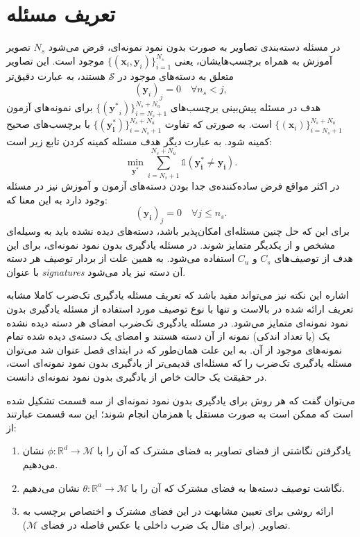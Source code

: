 \section{تعریف مسئله}\label{problem_definition}
در مسئله دسته‌بندی تصاویر به صورت بدون نمود نمونه‌ای، فرض می‌شود $N_s$ تصویر آموزش به همراه برچسب‌هایشان، یعنی 
    $ \{ (\mathbf{x}_i, \mathbf{y}_i) \}_{i=1}^{N_s} $
    موجود است. این تصاویر متعلق به دسته‌های موجود در $\mathcal{S}$ هستند، به عبارت دقیق‌تر 
    \begin{equation}    
     (\mathbf{y}_i)_j = 0
     \quad \forall n_s < j,
    \end{equation}
    هدف در مسئله پیش‌بینی برچسب‌های 
$ \{ (\mathbf{y^{\ast}}_i) \}_{i=N_s + 1}^{N_s + N_u} $
برای 
     نمونه‌های آزمون 
$ \{ (\mathbf{x}_i) \}_{i=N_s + 1}^{N_s + N_u} $
است. به صورتی که تفاوت
 $ \{ (\mathbf{y^{\ast}_i}) \}_{i=N_s + 1}^{N_s + N_u} $ 
 با برچسب‌های صحیح 
‌کمینه شود. به عبارت دیگر هدف مسئله کمینه کردن تابع زیر است:
\begin{equation}
\min_{\mathbf{y^{\ast}}} \sum_{i=N_s+1}^{N_s + N_u} \mathds{1}(\mathbf{y^{\ast}_i \neq y_i}). 
\end{equation}
در اکثر مواقع فرض ساده‌کننده‌ی جدا بودن دسته‌های آزمون و آموزش نیز در مسئله وجود دارد به این معنا که:
\begin{equation}
\mathbf{(y_i)}_j = 0    \quad \forall  j \leq n_s.
\end{equation}
برای این که حل چنین مسئله‌ای امکان‌پذیر باشد، دسته‌های دیده نشده باید به وسیله‌ای مشخص و از یکدیگر متمایز شوند. در مسئله یادگیری بدون نمود نمونه‌ای، برای این هدف از توصیف‌های $C_s$ و $C_u$ استفاده می‌شود. به همین علت از بردار توصیف هر دسته با عنوان \textit{\glspl{signature}} آن دسته نیز یاد می‌شود. 

اشاره این نکته نیز می‌تواند مفید باشد که تعریف مسئله یادگیری تک‌ضرب کاملا مشابه تعریف ارائه شده در بالاست و تنها با نوع توصیف مورد استفاده از مسئله یادگیری بدون نمود نمونه‌ای متمایز می‌شود. در مسئله یادگیری تک‌ضرب امضای هر دسته دیده نشده یک (یا تعداد اندکی) نمونه از آن دسته هستند و امضای یک دسته‌ی دیده شده تمام نمونه‌های موجود از آن. به این علت همان‌طور که در ابتدای فصل عنوان شد می‌توان مسئله یادگیری تک‌ضرب را که مسئله‌ای قدیمی‌تر از یادگیری بدون نمود نمونه‌ای است، در حقیقت یک حالت خاص از یادگیری بدون نمود نمونه‌ای دانست.
  

 می‌توان گفت که هر روش برای یادگیری بدون نمود نمونه‌ای از سه قسمت تشکیل شده است که ممکن است به صورت مستقل یا همزمان انجام شوند؛ این سه قسمت عبارتند از:
\begin{enumerate}
  \item یادگرفتن نگاشتی از فضای تصاویر به فضای مشترک
  که آن را با 
  $\phi: \mathbb{R}^d \to \mathcal{M}$
   نشان می‌دهیم.
  \item نگاشت توصیف دسته‌ها به فضای مشترک
  که آن را با
   $\theta: \mathbb{R}^a \to \mathcal{M}$ 
   نشان می‌دهیم.
  \item
   ارائه روشی برای تعیین مشابهت در این فضای مشترک و اختصاص برچسب به تصاویر. (برای مثال یک ضرب داخلی یا عکس فاصله در فضای $\mathcal{M}$).
\end{enumerate}

